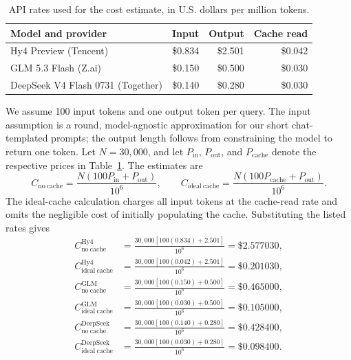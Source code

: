 \documentclass{article}
\begin{document}
\begin{table}[h]
  \caption{API rates used for the cost estimate, in U.S. dollars per million
  tokens.}
  \label{tab:cost-estimation-rates}
  \centering
  \small
  \begin{tabular}{lrrr}
    \hline
    Model and provider & Input & Output & Cache read \\
    \hline
    Hy4 Preview (Tencent) & \$0.834 & \$2.501 & \$0.042 \\
    GLM 5.3 Flash (Z.ai) & \$0.150 & \$0.500 & \$0.030 \\
    DeepSeek V4 Flash 0731 (Together) & \$0.140 & \$0.280 & \$0.030 \\
    \hline
  \end{tabular}
\end{table}

We assume 100 input tokens and one output token per query. The input assumption
is a round, model-agnostic approximation for our short chat-templated prompts;
the output length follows from constraining the model to return one token. Let
$N=30{,}000$, and let $P_{\mathrm{in}}$, $P_{\mathrm{out}}$, and
$P_{\mathrm{cache}}$ denote the respective prices in
Table~\ref{tab:cost-estimation-rates}. The estimates are
\[
  C_{\mathrm{no\ cache}}
  = \frac{N(100P_{\mathrm{in}}+P_{\mathrm{out}})}{10^6},
  \qquad
  C_{\mathrm{ideal\ cache}}
  = \frac{N(100P_{\mathrm{cache}}+P_{\mathrm{out}})}{10^6}.
\]
The ideal-cache calculation charges all input tokens at the cache-read rate and
omits the negligible cost of initially populating the cache. Substituting the
listed rates gives
\begin{align*}
  C_{\mathrm{no\ cache}}^{\mathrm{Hy4}}
    &= \frac{30{,}000[100(0.834)+2.501]}{10^6}
     = \$2.577030, \\
  C_{\mathrm{ideal\ cache}}^{\mathrm{Hy4}}
    &= \frac{30{,}000[100(0.042)+2.501]}{10^6}
     = \$0.201030, \\
  C_{\mathrm{no\ cache}}^{\mathrm{GLM}}
    &= \frac{30{,}000[100(0.150)+0.500]}{10^6}
     = \$0.465000, \\
  C_{\mathrm{ideal\ cache}}^{\mathrm{GLM}}
    &= \frac{30{,}000[100(0.030)+0.500]}{10^6}
     = \$0.105000, \\
  C_{\mathrm{no\ cache}}^{\mathrm{DeepSeek}}
    &= \frac{30{,}000[100(0.140)+0.280]}{10^6}
     = \$0.428400, \\
  C_{\mathrm{ideal\ cache}}^{\mathrm{DeepSeek}}
    &= \frac{30{,}000[100(0.030)+0.280]}{10^6}
     = \$0.098400.
\end{align*}
\end{document}
